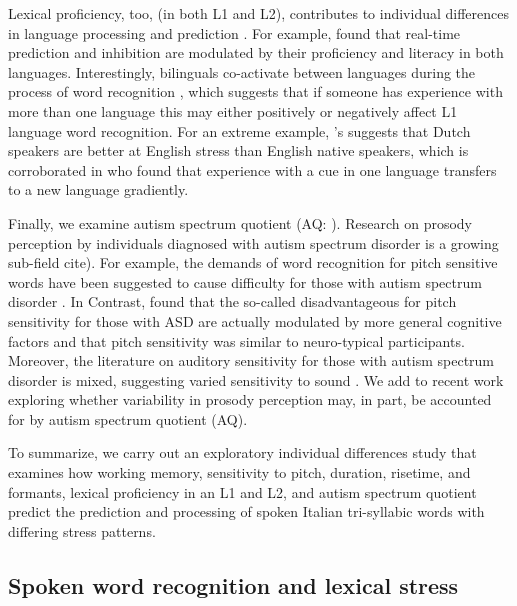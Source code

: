 Lexical proficiency, too,  (in both L1 and L2), contributes to individual differences in language processing and prediction \citep{Diependaele2013,Yap2012}. For example, \citep{Kukona2016} found that real-time prediction and inhibition are modulated by their proficiency and literacy in both languages.
Interestingly, bilinguals co-activate between languages during the process of word recognition \citep{kroll1997lexical,dijkstra2002architecture,marian2003competing}, which suggests that if someone has experience with more than one language this may either positively or negatively affect L1 language word recognition. For an extreme example, \cite{cutler2007dutch}'s suggests that Dutch speakers are better at English stress than English native speakers, which is corroborated in \cite{Pajak_2014} who found that experience with a cue in one language transfers to a new language gradiently. 

Finally, we examine autism spectrum quotient (AQ: \cite{Baron-Cohen2001}). Research on prosody perception by individuals diagnosed with autism spectrum disorder is a growing sub-field  cite)\cite[see ][]{Grice2023,Paul2005,McCann2003}. For example, the demands of word recognition for pitch sensitive words have been suggested to cause difficulty for those with autism spectrum disorder \citep{schelinski2020speech}. In Contrast, \cite{grossman2023relationship} found that the so-called disadvantageous for pitch sensitivity for those with ASD are actually modulated by more general cognitive factors and that pitch sensitivity was similar to neuro-typical participants. Moreover, the literature on auditory sensitivity for those with autism spectrum disorder is mixed, suggesting varied sensitivity to sound \citep{Kuiper2019,Stiegler2010}. We add to recent work \cite{Sinagra2022} exploring whether variability in prosody perception may, in part, be accounted for by autism spectrum quotient (AQ). 

To summarize, we carry out an exploratory individual differences study that examines how working memory, sensitivity to pitch, duration, risetime, and formants, lexical proficiency in an L1 and L2, and autism spectrum quotient predict the prediction and processing of spoken Italian tri-syllabic words with differing stress patterns.

\subsection{Spoken word recognition and lexical stress}

